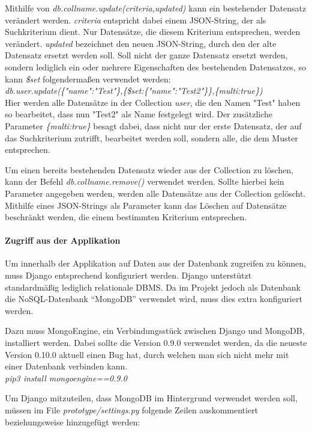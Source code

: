 Mithilfe von \textit{db.collname.update(criteria,updated)} kann ein bestehender Datensatz verändert werden. \textit{criteria} entspricht dabei einem JSON-String, der als Suchkriterium dient. Nur Datensätze, die diesem Kriterium entsprechen, werden verändert. \textit{updated} bezeichnet den neuen JSON-String, durch den der alte Datensatz ersetzt werden soll. Soll nicht der ganze Datensatz ersetzt werden, sondern lediglich ein oder mehrere Eigenschaften des bestehenden Datensatzes, so kann \textit{\$set} folgendermaßen verwendet werden:\\
\textit{db.user.update(\{"name":"Test"\},\{\$set:\{"name":"Test2"\}\},\{multi:true\})}\\
Hier werden alle Datensätze in der Collection \textit{user}, die den Namen "Test" haben so bearbeitet, dass nun "Test2" als Name festgelegt wird. Der zusätzliche Parameter \textit{\{multi:true\}} besagt dabei, dass nicht nur der erste Datensatz, der auf das Suchkriterium zutrifft, bearbeitet werden soll, sondern alle, die dem Muster entsprechen.

Um einen bereits bestehenden Datensatz wieder aus der Collection zu löschen, kann der Befehl \textit{db.collname.remove()} verwendet werden. Sollte hierbei kein Parameter angegeben werden, werden alle Datensätze aus der Collection gelöscht. Mithilfe eines JSON-Strings als Parameter kann das Löschen auf Datensätze beschränkt werden, die einem bestimmten Kriterium entsprechen.

\paragraph{Zugriff aus der Applikation}
Um innerhalb der Applikation auf Daten aus der Datenbank zugreifen zu können, muss Django entsprechend konfiguriert werden. Django unterstützt standardmäßig lediglich relationale DBMS. Da im Projekt jedoch als Datenbank die NoSQL-Datenbank “MongoDB” verwendet wird, muss dies extra konfiguriert werden.

Dazu muss MongoEngine, ein Verbindungsstück zwischen Django und MongoDB, installiert werden. Dabei sollte die Version 0.9.0 verwendet werden, da die neueste Version 0.10.0 aktuell einen Bug hat, durch welchen man sich nicht mehr mit einer Datenbank verbinden kann.\\
\textit{pip3 install mongoengine==0.9.0}

Um Django mitzuteilen, dass MongoDB im Hintergrund verwendet werden soll, müssen im File \textit{prototype/settings.py} folgende Zeilen auskommentiert beziehungsweise hinzugefügt werden:

